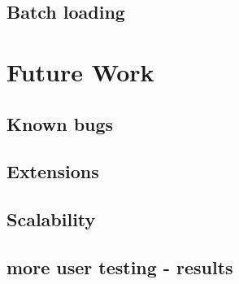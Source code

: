 \documentclass{hmcclinic}
\begin{document}
\section{Batch loading}

\chapter{Future Work}
\section{Known bugs}
\section{Extensions}
\section{Scalability}
\section{more user testing - results}
\end{document}
